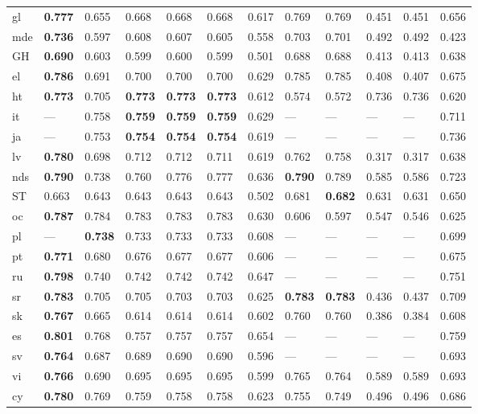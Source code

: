 \begin{longtable}{ llllllllllll }
\textsf{gl}                   & \bf{0.777} & 0.655 & 0.668 & 0.668 & 0.668 & 0.617 & 0.769 & 0.769 & 0.451 & 0.451 & 0.656 \\
\textsf{mde}                  & \bf{0.736} & 0.597 & 0.608 & 0.607 & 0.605 & 0.558 & 0.703 & 0.701 & 0.492 & 0.492 & 0.423 \\
\textsf{GH}                   & \bf{0.690} & 0.603 & 0.599 & 0.600 & 0.599 & 0.501 & 0.688 & 0.688 & 0.413 & 0.413 & 0.638 \\
\textsf{el}                   & \bf{0.786} & 0.691 & 0.700 & 0.700 & 0.700 & 0.629 & 0.785 & 0.785 & 0.408 & 0.407 & 0.675 \\
\textsf{ht}                   & \bf{0.773} & 0.705 & \bf{0.773} & \bf{0.773} & \bf{0.773} & 0.612 & 0.574 & 0.572 & 0.736 & 0.736 & 0.620 \\
\textsf{it}                   & --- & 0.758 & \bf{0.759} & \bf{0.759} & \bf{0.759} & 0.629 & --- & --- & --- & --- & 0.711 \\
\textsf{ja}                   & --- & 0.753 & \bf{0.754} & \bf{0.754} & \bf{0.754} & 0.619 & --- & --- & --- & --- & 0.736 \\
\textsf{lv}                   & \bf{0.780} & 0.698 & 0.712 & 0.712 & 0.711 & 0.619 & 0.762 & 0.758 & 0.317 & 0.317 & 0.638 \\
\textsf{nds}                  & \bf{0.790} & 0.738 & 0.760 & 0.776 & 0.777 & 0.636 & \bf{0.790} & 0.789 & 0.585 & 0.586 & 0.723 \\
\textsf{ST}                   & 0.663 & 0.643 & 0.643 & 0.643 & 0.643 & 0.502 & 0.681 & \bf{0.682} & 0.631 & 0.631 & 0.650 \\
\textsf{oc}                   & \bf{0.787} & 0.784 & 0.783 & 0.783 & 0.783 & 0.630 & 0.606 & 0.597 & 0.547 & 0.546 & 0.625 \\
\textsf{pl}                   & --- & \bf{0.738} & 0.733 & 0.733 & 0.733 & 0.608 & --- & --- & --- & --- & 0.699 \\
\textsf{pt}                   & \bf{0.771} & 0.680 & 0.676 & 0.677 & 0.677 & 0.606 & --- & --- & --- & --- & 0.675 \\
\textsf{ru}                   & \bf{0.798} & 0.740 & 0.742 & 0.742 & 0.742 & 0.647 & --- & --- & --- & --- & 0.751 \\
\textsf{sr}                   & \bf{0.783} & 0.705 & 0.705 & 0.703 & 0.703 & 0.625 & \bf{0.783} & \bf{0.783} & 0.436 & 0.437 & 0.709 \\
\textsf{sk}                   & \bf{0.767} & 0.665 & 0.614 & 0.614 & 0.614 & 0.602 & 0.760 & 0.760 & 0.386 & 0.384 & 0.608 \\
\textsf{es}                   & \bf{0.801} & 0.768 & 0.757 & 0.757 & 0.757 & 0.654 & --- & --- & --- & --- & 0.759 \\
\textsf{sv}                   & \bf{0.764} & 0.687 & 0.689 & 0.690 & 0.690 & 0.596 & --- & --- & --- & --- & 0.693 \\
\textsf{vi}                   & \bf{0.766} & 0.690 & 0.695 & 0.695 & 0.695 & 0.599 & 0.765 & 0.764 & 0.589 & 0.589 & 0.693 \\
\textsf{cy}                   & \bf{0.780} & 0.769 & 0.759 & 0.758 & 0.758 & 0.623 & 0.755 & 0.749 & 0.496 & 0.496 & 0.686 \\


\end{longtable}
